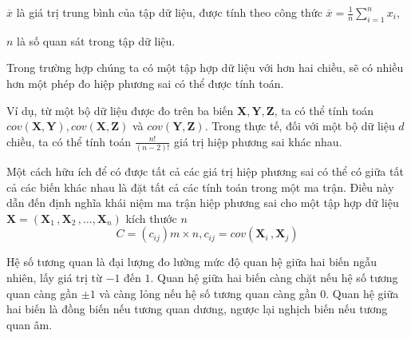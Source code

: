 \documentclass[../thesis.tex]{subfiles}
\begin{document}
$ \overline{x} $ là giá trị trung bình của tập dữ liệu, được tính theo công thức $ \overline{x} = \frac{1}{n}\sum^{n}_{i=1} x_i $,

$ n $ là số quan sát trong tập dữ liệu.


Trong trường hợp chúng ta có một tập hợp dữ liệu với hơn hai chiều, sẽ có nhiều hơn một phép đo hiệp phương sai có thể được tính toán. 

Ví dụ, từ một bộ dữ liệu được đo trên ba biến $ \mathbf{X}, \mathbf{Y}, \mathbf{Z} $, ta có thể tính toán $ cov(\mathbf{X}, \mathbf{Y}), cov(\mathbf{X}, \mathbf{Z}) $ và $ cov(\mathbf{Y}, \mathbf{Z}) $. Trong thực tế, đối với một bộ dữ liệu $ d $ chiều, ta có thể tính toán $ \frac{n!}{(n-2)!} $ giá trị hiệp phương sai khác nhau. 

Một cách hữu ích để có được tất cả các giá trị hiệp phương sai có thể có giữa tất cả các biến khác nhau là đặt tất cả các tính toán trong một ma trận. Điều này dẫn đến định nghĩa khái niệm ma trận hiệp phương sai cho một tập hợp dữ liệu $ \mathbf{X} = (\mathbf{X}_1\,, \mathbf{X}_2\,, \ldots, \mathbf{X}_n) $ kích thước $ n $
$$ C=(c_{ij}){m\times n}, c_{ij}=cov(\mathbf{X}_i\,,\mathbf{X}_j) $$


Hệ số tương quan là đại lượng đo lường mức độ quan hệ giữa hai biến ngẫu nhiên, lấy giá trị từ $ -1 $ đến $ 1 $. Quan hệ giữa hai biến càng chặt nếu hệ số tương quan càng gần $ \pm1 $ và càng lỏng nếu hệ số tương quan càng gần $ 0 $. Quan hệ giữa hai biến là đồng biến nếu tương quan dương, ngược lại nghịch biến nếu tương quan âm.
\end{document}
